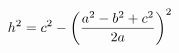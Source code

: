 \documentclass[preview]{standalone}
\begin{document}
\begin{align*}
\special{dvisvgm:raw <g id='unique000'>}h^2 = c^2 - \left(\frac{a^2 - b^2 + c^2}{2a}\right)^2\special{dvisvgm:raw </g>}
\end{align*}
\end{document}
